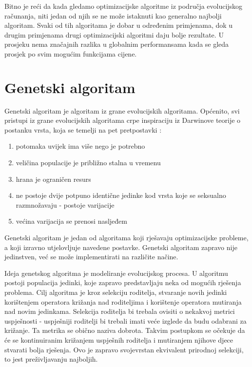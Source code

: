 \documentclass[zavrsnirad]{fer}
\begin{document}
		Bitno je reći da kada gledamo optimizacijske algoritme iz područja evolucijskog računanja, niti jedan od njih se ne može istaknuti kao generalno najbolji algoritam. Svaki od tih algoritama je dobar u određenim primjenama, dok u drugim primjenama drugi optimizacijski algoritmi daju bolje rezultate. U prosjeku nema značajnih razlika u globalnim performansama kada se gleda prosjek po svim mogućim funkcijama cijene.\cite{skriptaEvolucijskoRacunarstvo}
	
	\section{Genetski algoritam}
	\label{pog:Genetski algoritam}
	
		Genetski algoritam je algoritam iz grane evolucijskih algoritama. Općenito, svi pristupi iz grane evolucijskih algoritama crpe inspiraciju iz Darwinove teorije o postanku vrsta, koja se temelji na pet pretpostavki \cite{skriptaEvolucijskoRacunarstvo}:
		\begin{enumerate}
			\item potomaka uvijek ima više nego je potrebno
			\item veličina populacije je približno stalna u vremenu
			\item hrana je ograničen resurs
			\item ne postoje dvije potpuno identične jedinke kod vrsta koje se seksualno razmnožavaju - postoje varijacije
			\item većina varijacija se prenosi nasljeđem
		\end{enumerate}
		
		Genetski algoritam je jedan od algoritama koji rješavaju optimizacijske probleme, a koji izravno utjelovljuje navedene postavke. Genetski algoritam zapravo nije jedinstven, već se može implementirati na različite načine. \cite{skriptaEvolucijskoRacunarstvo}
		
		Ideja genetskog algoritma je modeliranje evolucijskog procesa. U algoritmu postoji populacija jedinki, koje zapravo predstavljaju neka od mogućih rješenja problema. Cilj algoritma je kroz selekciju roditelja, stvaranje novih jedinki korištenjem operatora križanja nad roditeljima i korištenje operatora mutiranja nad novim jedinkama. Selekcija roditelja bi trebala ovisiti o nekakvoj metrici uspješnosti - uspješniji roditelji bi trebali imati veće izglede da budu odabrani za križanje. Ta metrika se obično naziva dobrota. Takvim postupkom se očekuje da će se kontinuiranim križanjem uspješnih roditelja i mutiranjem njihove djece stvarati bolja rješenja. Ovo je zapravo svojevrstan ekvivalent prirodnoj selekciji, to jest preživljavanju najboljih.
	
\end{document}
